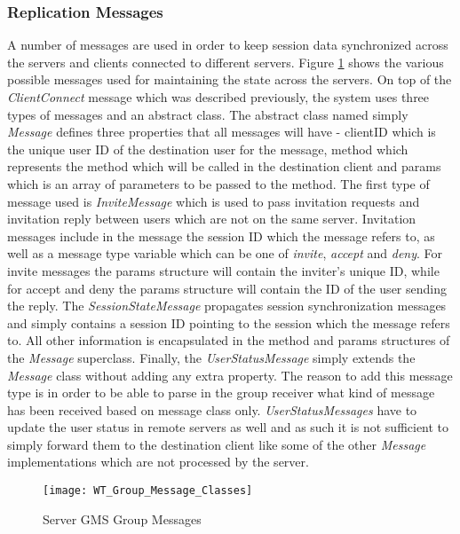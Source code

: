\subsubsection*{Replication Messages}

A number of messages are used in order to keep session data synchronized across the servers and clients connected to different servers. Figure \ref{fig:groupmsgs} shows the various possible messages used for maintaining the state across the servers. On top of the \textit{ClientConnect} message which was described previously, the system uses three types of messages and an abstract class. The abstract class named simply \textit{Message} defines three properties that all messages will have - clientID which is the unique user ID of the destination user for the message, method which represents the method which will be called in the destination client and params which is an array of parameters to be passed to the method. The first type of message used is \textit{InviteMessage} which is used to pass invitation requests and invitation reply between users which are not on the same server. Invitation messages include in the message the session ID which the message refers to, as well as a message type variable which can be one of \textsl{invite}, \textsl{accept} and \textsl{deny}. For invite messages the params structure will contain the inviter's unique ID, while for accept and deny the params structure will contain the ID of the user sending the reply. The \textit{SessionStateMessage} propagates session synchronization messages and simply contains a session ID pointing to the session which the message refers to. All other information is encapsulated in the method and params structures of the \textit{Message} superclass. Finally, the \textit{UserStatusMessage} simply extends the \textit{Message} class without adding any extra property. The reason to add this message type is in order to be able to parse in the group receiver what kind of message has been received based on message class only. \textit{UserStatusMessages} have to update the user status in remote servers as well and as such it is not sufficient to simply forward them to the destination client like some of the other \textit{Message} implementations which are not processed by the server.
 
\begin{figure}
	\centering
	\texttt{[image: WT\_Group\_Message\_Classes]}
	\caption{Server GMS Group Messages}
	\label{fig:groupmsgs}
\end{figure}

